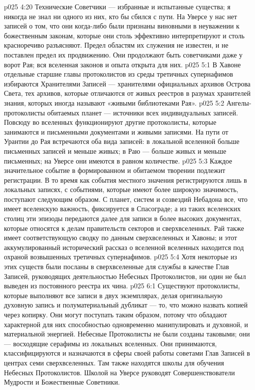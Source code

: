 \vs p025 4:20 Технические Советчики --- избранные и испытанные существа; я никогда не знал ни одного из них, кто бы сбился с пути. На Уверсе у нас нет записей о том, что они когда\hyp{}либо были признаны виновными в неуважении к божественным законам, которые они столь эффективно интерпретируют и столь красноречиво разъясняют. Предел областям их служения не известен, и не поставлен предел их продвижению. Они продолжают быть советчиками даже у ворот Рая; вся вселенная законов и опыта открыта для них.
\vs p025 5:1 В Хавоне отдельные старшие главы протоколистов из среды третичных супернафимов избираются Хранителями Записей --- хранителями официальных архивов Острова Света, тех архивов, которые отличаются от живых реестров в разумах хранителей знания, которых иногда называют «живыми библиотеками Рая».
\vs p025 5:2 Ангелы\hyp{}протоколисты обитаемых планет --- источники всех индивидуальных записей. Повсюду во вселенных функционируют другие протоколисты, которые занимаются и письменными документами и живыми записями. На пути от Урантии до Рая встречаются оба вида записей: в локальной вселенной больше письменных записей и меньше живых; в Раю --- больше живых и меньше письменных; на Уверсе они имеются в равном количестве.
\vs p025 5:3 Каждое значительное событие в формированном и обитаемом творении подлежит регистрации. В то время как события местного значения регистрируются лишь в локальных записях, с событиями, которые имеют более широкую значимость, поступают следующим образом. С планет, систем и созвездий Небадона все, что имеет вселенскую важность, фиксируется в Спасограде; а из таких вселенских столиц эти эпизоды передаются далее для записи в более высоких документах, которые относятся к делам правительств секторов и сверхвселенных. Рай также имеет соответствующую сводку по данным сверхвселенных и Хавоны; и этот аккумулированный исторический рассказ о вселенной вселенных находится под охраной возвышенных третичных супернафимов.
\vs p025 5:4 Хотя некоторые из этих существ были посланы в сверхвселенные для службы в качестве Глав Записей, руководящих деятельностью Небесных Протоколистов, ни один не был выведен из постоянного реестра их чина.
\vs p025 6:1 Существуют протоколисты, которые выполняют все записи в двух экземплярах, делая оригинальную духовную запись и полуматериальный дубликат --- то, что можно назвать копией через копирку. Они могут поступать таким образом, потому что обладают характерной для них способностью одновременно манипулировать и духовной, и материальной энергией. Небесные Протоколисты не были созданы таковыми; они --- восходящие серафимы из локальных вселенных. Они принимаются, классифицируются и назначаются в сферы своей работы советами Глав Записей в центрах семи сверхвселенных. Там также находятся школы для обучения Небесных Протоколистов. Школой на Уверсе руководят Совершенствователи Мудрости и Божественные Советники.

